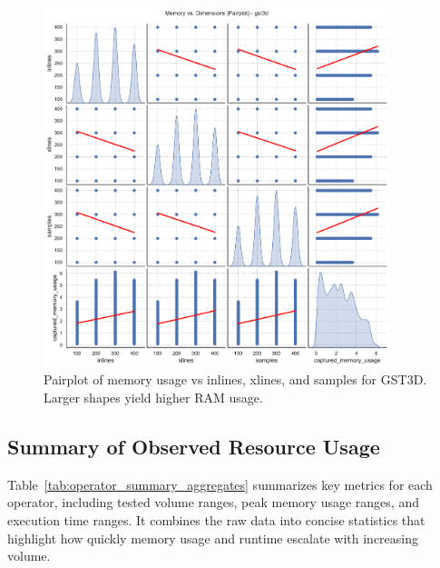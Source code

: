 \begin{figure}[htbp]
    \centering
    \includegraphics[width=0.9\textwidth]{assets/images/05/memory_vs_dimensions_pairplot_gst3d}
    \caption{Pairplot of memory usage vs inlines, xlines, and samples for \ac{GST3D}.
    Larger shapes yield higher \ac{RAM} usage.}
    \label{fig:memory_vs_dimensions_pairplot_gst3d}
\end{figure}

\subsection{Summary of Observed Resource Usage}
\label{subsec:resource-usage-summary}

Table~\ref{tab:operator_summary_aggregates} summarizes key metrics for each operator, including tested volume ranges, peak memory usage ranges, and execution time ranges.
It combines the raw data into concise statistics that highlight how quickly memory usage and runtime escalate with increasing volume.

